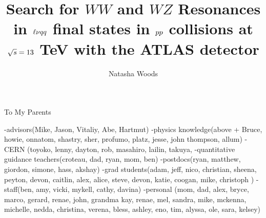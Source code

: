 





\title{Search for $WW$ and $WZ$ Resonances in $\ell\nu \MakeLowercase{qq}$ final states in $\MakeLowercase{pp}$ collisions at $\sqrt{\MakeLowercase{s}}=13$ TeV with the ATLAS detector}
\author{Natasha Woods}
\deanlinethree{}

\begin{frontmatter}
\maketitle

\copyrightpage

\tableofcontents


\listoffigures

\listoftables
\begin{abstract}

\end{abstract}

\begin{dedication}
\vspace*{\fill}
\begin{center}
To My Parents
\end{center}
\vspace*{\fill}
\end{dedication}

\begin{acknowledgements}
-advisors(Mike, Jason, Vitaliy, Abe, Hartmut)
-physics knowledge(above + Bruce, howie, onnatom, shastry, sher, profumo, platz, jesse, john thompson, allum)
-CERN (toyoko, lenny, dayton, rob, masahiro, lailin, takuya, 
-quantitative guidance teachers(croteau, dad, ryan, mom, ben)
-postdocs(ryan, matthew, giordon, simone, hass, akshay)
-grad students(adam, jeff, nico, christian, sheena, peyton, devon, caitlin, alex, alice, steve, devon, katie, coogan, mike, christoph  )
-staff(ben, amy, vicki, mykell, cathy, davina)
-personal (mom, dad, alex, bryce, marco, gerard, renae, john, grandma kay, renae, mel, sandra, mike, mckenna, michelle, nedda, christina, verena, bless, ashley, eno, tim, alyssa, ole, sara, kelsey)

\end{acknowledgements}

\end{frontmatter}
